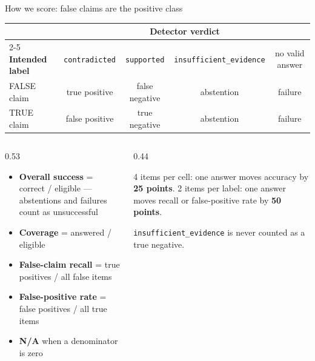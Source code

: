 \begin{frame}{How we score: false claims are the positive class}
  \centering\scriptsize
  \renewcommand{\arraystretch}{1.25}
  \begin{tabular}{@{}l c c c c@{}}
    \toprule
    & \multicolumn{4}{c}{\textbf{Detector verdict}}\\
    \cmidrule(l){2-5}
    \textbf{Intended label} & \texttt{contradicted} & \texttt{supported} & \texttt{insufficient\_evidence} & no valid answer\\
    \midrule
    FALSE claim & \cellcolor{green!12}true positive & \cellcolor{red!10}false negative & abstention & failure\\
    TRUE claim & \cellcolor{red!10}false positive & \cellcolor{green!12}true negative & abstention & failure\\
    \bottomrule
  \end{tabular}\par
  \vspace{2mm}\raggedright
  \begin{columns}[T,onlytextwidth]
    \begin{column}{0.53\textwidth}
      \footnotesize
      \begin{itemize}\setlength{\itemsep}{0pt}
        \item \textbf{Overall success} = correct / eligible --- abstentions and failures count as unsuccessful
        \item \textbf{Coverage} = answered / eligible
        \item \textbf{False-claim recall} = true positives / all false items
        \item \textbf{False-positive rate} = false positives / all true items
        \item \textbf{N/A} when a denominator is zero
      \end{itemize}
    \end{column}
    \begin{column}{0.44\textwidth}
      \begin{numexample}
        \footnotesize 4 items per cell: one answer moves accuracy by \textbf{25 points}.
        2 items per label: one answer moves recall or false-positive rate by \textbf{50 points}.
      \end{numexample}
      \begin{mistake}
        \texttt{insufficient\_evidence} is never counted as a true negative.
      \end{mistake}

\end{column}
\end{columns}
\end{frame}
